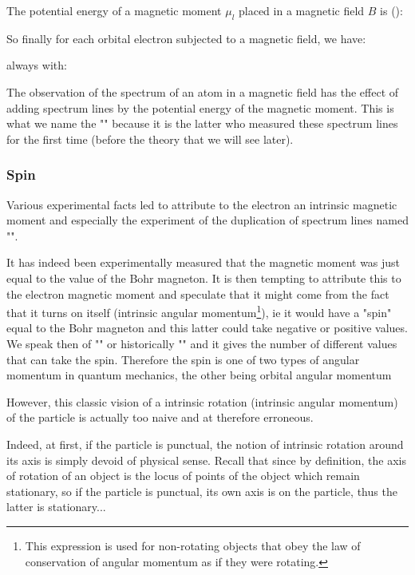     The potential energy of a magnetic moment $\mu_l$ placed in a magnetic field $B$ is ():
       
    So finally for each orbital electron subjected to a magnetic field, we have:
    
     always with:
     
     The observation of the spectrum of an atom in a magnetic field has the effect of adding spectrum lines by the potential energy of the magnetic moment. This is what we name the "" because it is the latter who measured these spectrum lines for the first time (before the theory that we will see later).
     
     \subsubsection{Spin}\label{spin}
     Various experimental facts led to attribute to the electron an intrinsic magnetic moment and especially the experiment of the duplication of spectrum lines named "".

     It has indeed been experimentally measured that the magnetic moment was just equal to the value of the Bohr magneton. It is then tempting to attribute this to the electron magnetic moment and speculate that it might come from the fact that it turns on itself (intrinsic angular momentum\footnote{This expression is used for non-rotating objects that obey the law of conservation of angular momentum as if they were rotating.}), ie it would have a "spin" equal to the Bohr magneton and this latter could take negative or positive values. We speak then of "" or historically "" and it gives the number of different values that can take the spin. Therefore the spin is one of two types of angular momentum in quantum mechanics, the other being orbital angular momentum

   However, this classic vision of a intrinsic rotation (intrinsic angular momentum) of the particle is actually too naive and at therefore erroneous.

    Indeed, at first, if the particle is punctual, the notion of intrinsic rotation around its axis is simply devoid of physical sense. Recall that since by definition, the axis of rotation of an object is the locus of points of the object which remain stationary, so if the particle is punctual, its own axis is on the particle, thus the latter is stationary...

